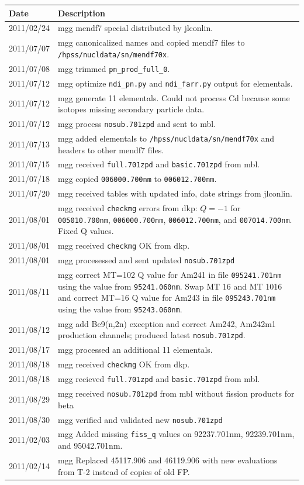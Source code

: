 \begin{tabular}{|p{72pt}|p{351pt}|} \hline
Date & Description \\ \hline
2011/02/24 & mgg mendf7 special distributed by jlconlin. \\ \hline
2011/07/07 & mgg canonicalized names and copied mendf7 files to
\texttt{/hpss/nucldata/sn/mendf70x}. \\ \hline 
2011/07/08 & mgg trimmed \texttt{pn\_prod\_full\_0}. \\ \hline
2011/07/12 & mgg optimize \texttt{ndi\_pn.py} and
\texttt{ndi\_farr.py} output for elementals. \\ \hline
2011/07/12 & mgg generate 11 elementals. Could not process Cd because
some isotopes missing secondary particle data.\\ \hline
2011/07/12 & mgg process \texttt{nosub.701zpd} and sent to mbl. \\ \hline
2011/07/13 & mgg added elementals to \texttt{/hpss/nucldata/sn/mendf70x} and
headers to other mendf7 files. \\ \hline
2011/07/15 & mgg received \texttt{full.701zpd} and \texttt{basic.701zpd} from
mbl. \\ \hline
2011/07/18 & mgg copied \texttt{006000.700nm} to
\texttt{006012.700nm}. \\ \hline  
2011/07/20 & mgg received tables with updated info, date strings from
jlconlin. \\ \hline
2011/08/01 & mgg received \texttt{checkmg} errors from dkp: $Q=-1$ for
\texttt{005010.700nm}, \texttt{006000.700nm}, \texttt{006012.700nm},
and \texttt{007014.700nm}.  Fixed Q values.\\ \hline   
2011/08/01 & mgg received \texttt{checkmg} OK from dkp. \\ \hline
2011/08/01 & mgg procesessed and sent updated \texttt{nosub.701zpd}
\\ \hline
2011/08/11 & mgg correct MT=102 Q value for Am241 in file
\texttt{095241.701nm} using the value from \texttt{95241.060nm}.
Swap MT 16 and MT 1016 and correct MT=16 Q value for Am243 in file
\texttt{095243.701nm} using the value from \texttt{95243.060nm}.
\\ \hline
2011/08/12 & mgg add Be9(n,2n) exception and correct Am242, Am242m1
production channels; produced latest \texttt{nosub.701zpd}. \\ \hline
2011/08/17 & mgg processed an additional 11 elementals. \\ \hline
2011/08/18 & mgg received \texttt{checkmg} OK from dkp. \\ \hline
2011/08/18 & mgg recieved \texttt{full.701zpd} and
\texttt{basic.701zpd} from mbl. \\ \hline
2011/08/29 & mgg received \texttt{nosub.701zpd} from mbl without
fission products for beta\\ \hline
2011/08/30 & mgg verified and validated new \texttt{nosub.701zpd}
\\ \hline
2011/02/03 & mgg Added missing \texttt{fiss\_q} values on 92237.701nm,
92239.701nm, and 95042.701nm. \\ \hline
2011/02/14 & mgg Replaced 45117.906 and 46119.906 with new evaluations
from T-2 instead of copies of old FP.
\end{tabular}

